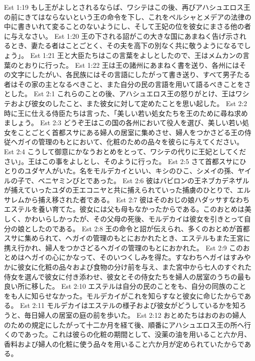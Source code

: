 Est 1:19  もし王がよしとされるならば、ワシテはこの後、再びアハシュエロス王の前にきてはならないという王の命令を下し、これをペルシャとメデアの法律の中に書きいれて変ることのないようにし、そして王妃の位を彼女にまさる他の者に与えなさい。
Est 1:20  王の下される詔がこの大きな国にあまねく告げ示されるとき、妻たる者はことごとく、その夫を高下の別なく共に敬うようになるでしょう」。
Est 1:21  王と大臣たちはこの言葉をよしとしたので、王はメムカンの言葉のとおりに行った。
Est 1:22  王は王の諸州にあまねく書を送り、各州にはその文字にしたがい、各民族にはその言語にしたがって書き送り、すべて男子たる者はその家の主となるべきこと、また自分の民の言語を用いて語るべきことをさとした。
Est 2:1  これらのことの後、アハシュエロス王の怒りがとけ、王はワシテおよび彼女のしたこと、また彼女に対して定めたことを思い起した。
Est 2:2  時に王に仕える侍臣たちは言った、「美しい若い処女たちを王のために尋ね求めましょう。
Est 2:3  どうぞ王はこの国の各州において役人を選び、美しい若い処女をことごとく首都スサにある婦人の居室に集めさせ、婦人をつかさどる王の侍従ヘガイの管理のもとにおいて、化粧のための品々を彼らに与えてください。
Est 2:4  こうして御意にかなうおとめをとって、ワシテの代りに王妃としてください」。王はこの事をよしとし、そのように行った。
Est 2:5  さて首都スサにひとりのユダヤ人がいた。名をモルデカイといい、キシのひこ、シメイの孫、ヤイルの子で、ベニヤミンびとであった。
Est 2:6  彼はバビロンの王ネブカデネザルが捕えていったユダの王エコニヤと共に捕えられていった捕虜のひとりで、エルサレムから捕え移された者である。
Est 2:7  彼はそのおじの娘ハダッサすなわちエステルを養い育てた。彼女には父も母もなかったからである。このおとめは美しく、かわいらしかったが、その父母の死後、モルデカイは彼女を引きとって自分の娘としたのである。
Est 2:8  王の命令と詔が伝えられ、多くのおとめが首都スサに集められて、ヘガイの管理のもとにおかれたとき、エステルもまた王宮に携え行かれ、婦人をつかさどるヘガイの管理のもとにおかれた。
Est 2:9  このおとめはヘガイの心にかなって、そのいつくしみを得た。すなわちヘガイはすみやかに彼女に化粧の品々および食物の分け前を与え、また宮中から七人のすぐれた侍女を選んで彼女に付き添わせ、彼女とその侍女たちを婦人の居室のうちの最も良い所に移した。
Est 2:10  エステルは自分の民のことをも、自分の同族のことをも人に知らせなかった。モルデカイがこれを知らすなと彼女に命じたからである。
Est 2:11  モルデカイはエステルの様子および彼女がどうしているかを知ろうと、毎日婦人の居室の庭の前を歩いた。
Est 2:12  おとめたちはおのおの婦人のための規定にしたがって十二か月を経て後、順番にアハシュエロス王の所へ行くのであった。これは彼らの化粧の期間として、没薬の油を用いること六か月、香料および婦人の化粧に使う品々を用いること六か月が定められていたからである。
